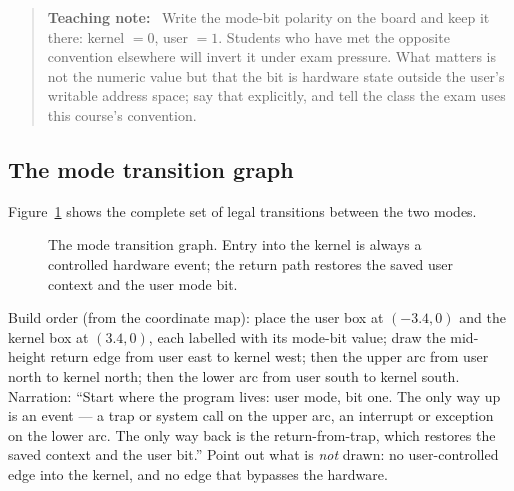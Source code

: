 \documentclass[11pt]{article}
\newenvironment{teachingaside}{\begin{quote}\small\color{primary-gold}\textbf{Teaching note:}\ }{\end{quote}}
\begin{document}
\begin{teachingaside}
Write the mode-bit polarity on the board and keep it there: kernel $=0$, user $=1$. Students who have met the opposite convention elsewhere will invert it under exam pressure. What matters is not the numeric value but that the bit is hardware state outside the user's writable address space; say that explicitly, and tell the class the exam uses this course's convention.
\end{teachingaside}

\subsection*{The mode transition graph}

Figure~\ref{fig:mode-graph} shows the complete set of legal transitions between the two modes.

\begin{figure}[h]
  \centering
  \caption{The mode transition graph. Entry into the kernel is always a controlled hardware event; the return path restores the saved user context and the user mode bit.}
  \label{fig:mode-graph}
\end{figure}

Build order (from the coordinate map): place the user box at $(-3.4,0)$ and the kernel box at $(3.4,0)$, each labelled with its mode-bit value; draw the mid-height return edge from user east to kernel west; then the upper arc from user north to kernel north; then the lower arc from user south to kernel south. Narration: ``Start where the program lives: user mode, bit one. The only way up is an event --- a trap or system call on the upper arc, an interrupt or exception on the lower arc. The only way back is the return-from-trap, which restores the saved context and the user bit.'' Point out what is \emph{not} drawn: no user-controlled edge into the kernel, and no edge that bypasses the hardware.
\end{document}
